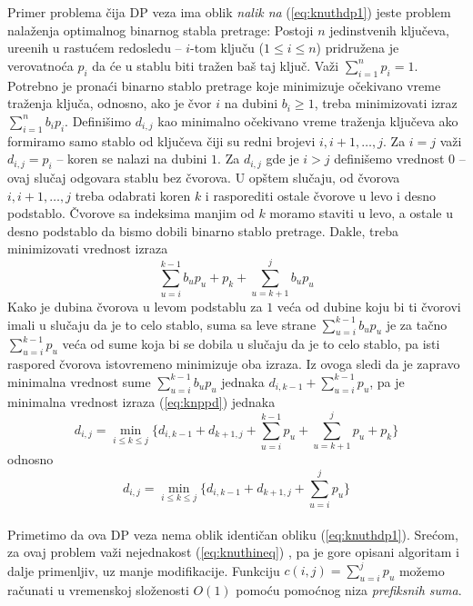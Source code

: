 \documentclass[a4paper,12pt]{article}
\numberwithin{equation}{subsection}
\begin{document}
Primer problema \v cija DP veza ima oblik \textit{nalik na} (\ref{eq:knuthdp1}) jeste problem nala\v zenja optimalnog binarnog stabla pretrage: Postoji $n$ jedinstvenih klju\v ceva, ure\dj enih u rastu\' cem redosledu -- $i$-tom klju\v cu ($1 \leq i \leq n$) pridru\v zena je verovatno\' ca $p_i$ da \' ce u stablu biti tra\v zen ba\v s taj klju\v c. Va\v zi $\sum_{i=1}^{n} p_i = 1$. Potrebno je prona\' ci binarno stablo pretrage koje minimizuje o\v cekivano vreme tra\v zenja klju\v ca, odnosno, ako je \v cvor $i$ na dubini $b_i \geq 1$, treba minimizovati izraz $\sum_{i=1}^{n} b_ip_i$. Defini\v simo $d_{i,j}$ kao minimalno o\v cekivano vreme tra\v zenja klju\v ceva ako formiramo samo stablo od klju\v ceva \v ciji su redni brojevi $i,i+1,\ldots,j$. Za $i=j$ va\v zi $d_{i,j} = p_i$ -- koren se nalazi na dubini $1$. Za $d_{i,j}$ gde je $i>j$ defini\v semo vrednost $0$ -- ovaj slu\v caj odgovara stablu bez \v cvorova. U op\v stem slu\v caju, od \v cvorova $i,i+1,\ldots,j$ treba odabrati koren $k$ i rasporediti ostale \v cvorove u levo i desno podstablo. \v Cvorove sa indeksima manjim od $k$ moramo staviti u levo, a ostale u desno podstablo da bismo dobili binarno stablo pretrage. Dakle, treba minimizovati vrednost izraza
\begin{equation} \label{eq:knppd}
	\sum_{u=i}^{k-1} b_u p_u + p_k + \sum_{u=k+1}^{j} b_u p_u
\end{equation}
Kako je dubina \v cvorova u levom podstablu za $1$ ve\' ca od dubine koju bi ti \v cvorovi imali u slu\v caju da je to celo stablo, suma sa leve strane $\sum_{u=i}^{k-1} b_u p_u$ je za ta\v cno $\sum_{u=i}^{k-1} p_u$ ve\' ca od sume koja bi se dobila u slu\v caju da je to celo stablo, pa isti raspored \v cvorova istovremeno minimizuje oba izraza. Iz ovoga sledi da je zapravo minimalna vrednost sume $\sum_{u=i}^{k-1} b_u p_u$ jednaka $d_{i, k-1} + \sum_{u=i}^{k-1} p_u$, pa je minimalna vrednost izraza (\ref{eq:knppd}) jednaka
$$
	d_{i,j} = \min_{i \leq k \leq j} \{ d_{i, k-1} + d_{k+1, j} + 
		\sum_{u=i}^{k-1} p_u + \sum_{u=k+1}^{j} p_u + p_k \}
$$
odnosno
\begin{equation} \label{eq:knpd}
	d_{i,j} = \min_{i \leq k \leq j} \{ d_{i, k-1} + d_{k+1, j} + 
		\sum_{u=i}^{j} p_u\}
\end{equation}
\\

Primetimo da ova DP veza nema oblik identi\v can obliku (\ref{eq:knuthdp1}). Sre\' com, za ovaj problem va\v zi nejednakost (\ref{eq:knuthineq}) \cite{knuthtree}, pa je gore opisani algoritam i dalje primenljiv, uz manje modifikacije. Funkciju $c(i, j) = \sum_{u=i}^{j} p_u$ mo\v zemo ra\v cunati u vremenskoj slo\v zenosti $O(1)$ pomo\' cu pomo\' cnog niza \textit{prefiksnih suma}.
\end{document}
